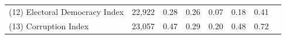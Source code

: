 \begin{tabularx}{\linewidth}{@{} l*{7}{Y} @{}}
\hspace{0.5cm} (12) Electoral Democracy Index   &          22,922                  &            0.28                       &            0.26                 &            0.07                 &            0.18                 &            0.41                 \\
\hspace{0.5cm} (13) Corruption Index                    &          23,057                    &            0.47                         &            0.29                   &            0.20                   &            0.48                   &            0.72                   \\
\bottomrule
\end{tabularx}
